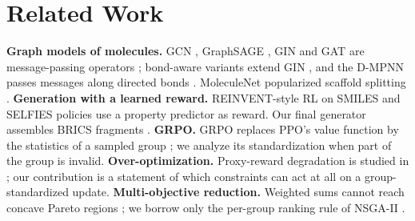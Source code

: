 \documentclass[10pt,letterpaper]{article}
\begin{document}
\section{Related Work}
\textbf{Graph models of molecules.} GCN \cite{kipf2017}, GraphSAGE \cite{hamilton2017}, GIN \cite{xu2019} and GAT \cite{velickovic2018} are message-passing operators \cite{gilmer2017}; bond-aware variants extend GIN \cite{hu2020}, and the D-MPNN passes messages along directed bonds \cite{yang2019}. MoleculeNet popularized scaffold splitting \cite{wu2018,bemis1996}. \textbf{Generation with a learned reward.} REINVENT-style RL on SMILES \cite{olivecrona2017} and SELFIES policies \cite{krenn2020} use a property predictor as reward. Our final generator assembles BRICS fragments \cite{degen2008}. \textbf{GRPO.} GRPO replaces PPO's value function \cite{schulman2017} by the statistics of a sampled group \cite{shao2024}; we analyze its standardization when part of the group is invalid. \textbf{Over-optimization.} Proxy-reward degradation is studied in \cite{gao2022,skalse2022,manheim2018}; our contribution is a statement of which constraints can act at all on a group-standardized update. \textbf{Multi-objective reduction.} Weighted sums cannot reach concave Pareto regions \cite{das1997}; we borrow only the per-group ranking rule of NSGA-II \cite{deb2002}.
\end{document}
